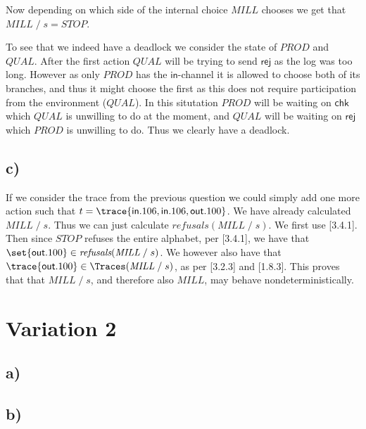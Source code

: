 \documentclass[a4paper, 11pt]{article}
\def\Prod{\textit{PROD}}
\def\Qual{\textit{QUAL}}
\def\Mill{\textit{MILL}}
\def\Stop{\textit{STOP}}
\def\inc{\textsf{in}}
\def\chk{\textsf{chk}}
\def\rej{\textsf{rej}}
\def\outc{\textsf{out}}
\newcommand{\law}[2]{[#1\;\text{#2}]}
\def\after{\;/\;}
\def\Refusals{\textit{refusals}}
\begin{document}
Now depending on which side of the internal choice $\Mill$ chooses we get that $\Mill \after s = \Stop$.

To see that we indeed have a deadlock we consider the state of $\Prod$ and $\Qual$. After the first action $\Qual$ will be trying to send $\rej$ as the log was too long. However as only $\Prod$ has the $\inc$-channel it is allowed to choose both of its branches, and thus it might choose the first as this does not require participation from the environment ($\Qual$). In this situtation $\Prod$ will be waiting on $\chk$ which $\Qual$ is unwilling to do at the moment, and $\Qual$ will be waiting on $\rej$ which $\Prod$ is unwilling to do. Thus we clearly have a deadlock.


\subsection{c)} %
If we consider the trace from the previous question we could simply add one more action such that $t = \trace{\inc . 106, \inc . 106, \outc . 100}$. We have already calculated $\Mill \after s$. Thus we can just calculate $\Refusals(\Mill \after s)$. We first use \law{3.4.1}{L4}. Then since $\Stop$ refuses the entire alphabet, per \law{3.4.1}{L1}, we have that $\set{\outc . 100} \in \Refusals(\Mill \after s)$. We however also have that $\trace{\outc . 100} \in \Traces(\Mill \after s)$, as per \law{3.2.3}{L2} and \law{1.8.3}{L3A}. This proves that that $\Mill \after s$, and therefore also $\Mill$, may behave nondeterministically.


\section{Variation 2} %
\label{sec:variation_2}

\subsection{a)} %


\subsection{b)} %

\end{document}
